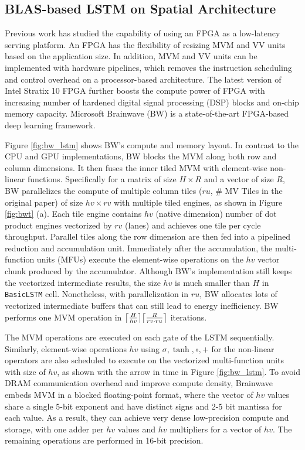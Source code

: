 \subsection{BLAS-based LSTM on Spatial Architecture}

Previous work has studied the capability of using an FPGA as a low-latency serving platform.
An FPGA has the flexibility of resizing MVM and VV units based on the application size.
In addition, MVM and VV units can be implemented with hardware pipelines,
  which removes the instruction scheduling and control overhead on a processor-based
  architecture.
The latest version of Intel Stratix 10 FPGA further boosts the compute power of FPGA
  with increasing number of hardened digital signal processing (DSP) blocks
  and on-chip memory capacity.
Microsoft Brainwave (BW) \cite{fowers2018configurable}
  is a state-of-the-art FPGA-based deep learning framework.

Figure \ref{fig:bw_lstm} shows BW's compute and memory layout.
In contrast to the CPU and GPU implementations, BW blocks the MVM along both
  row and column dimensions.
It then fuses the inner tiled MVM with element-wise non-linear functions.
Specifically for a matrix of size $H\times R$ and a vector of size $R$,
BW parallelizes the compute of multiple column tiles ($ru$, \# MV Tiles in the original paper) of size
$hv\times rv$ with multiple tiled engines, as shown in Figure \ref{fig:bwt} (a). 
Each tile engine contains $hv$ (native dimension) number of dot
product engines vectorized by $rv$ (lanes) and achieves one tile per cycle throughput. 
Parallel tiles along the row dimension are then fed into a pipelined reduction and accumulation
unit.
Immediately after the accumulation, the multi-function units (MFUs) execute the
element-wise operations on the $hv$ vector chunk produced by the accumulator.
Although BW's implementation still keeps the vectorized intermediate results, the size $hv$ is much
smaller than $H$ in \texttt{BasicLSTM} cell.
Nonetheless, with parallelization in $ru$,
  BW allocates lots of vectorized intermediate buffers that can still lead to energy inefficiency.
BW performs one MVM operation in $\ceil[\big]{\frac{H}{hv}}\ceil[\big]{\frac{R}{rv\cdot ru}}$
  iterations.

The MVM operations are executed on each gate of the LSTM sequentially.
Similarly, element-wise operations $hv$ using $\sigma, \tanh, \circ, +$ for the non-linear 
operators are also scheduled to execute on the vectorized multi-function units with size
of $hv$, as shown with the arrow in time in Figure \ref{fig:bw_lstm}.
To avoid DRAM communication overhead and improve compute density, Brainwave embeds MVM in a blocked floating-point format, 
where the vector of $hv$ values share a single 5-bit exponent and have distinct signs and 2-5 bit mantissa for
each value. As a result, they can achieve very dense low-precision compute and storage, with one
adder per $hv$ values and $hv$ multipliers for a vector of $hv$. The remaining operations are
performed in 16-bit precision.

